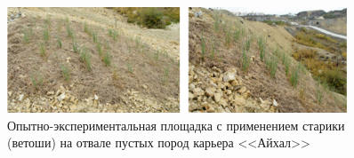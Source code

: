 \begin{figure}
  \begin{center}
    \includegraphics[width=0.9\textwidth]{authors/nekiforov-fig3.jpg}
  \end{center}
  \caption{Опытно-экспериментальная площадка с применением старики (ветоши) на отвале пустых пород карьера <<Айхал>>}
  \label{fig:nekiforov-fig3}
\end{figure}
